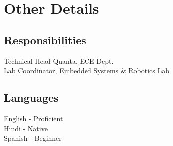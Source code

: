 \documentclass[]{deedy-resume-openfont}
\begin{document}
\begin{minipage}[t]{0.33\textwidth}
\section{Other Details}
\subsection{Responsibilities}
Technical Head Quanta, ECE Dept. \\
Lab Coordinator, Embedded Systems \& Robotics Lab
\sectionsep

\subsection{Languages}
English - Proficient \\
Hindi - Native \\
Spanish - Beginner
\sectionsep

%
%

\end{minipage} 
\hfill
\end{document}
